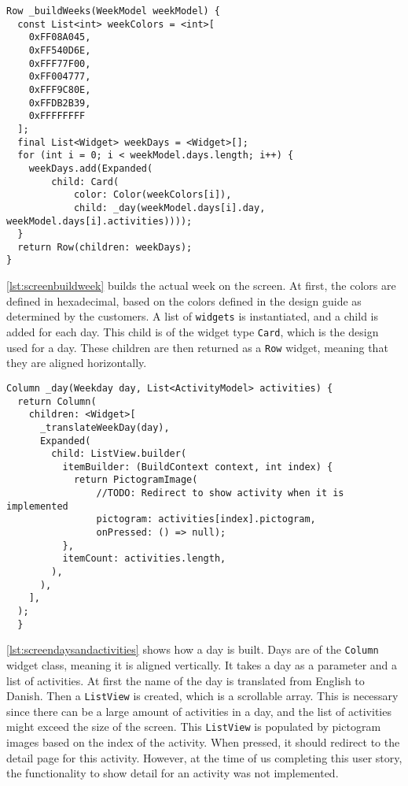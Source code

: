 \begin{lstlisting}[caption={Building the week},label={lst:screenbuildweek}]
  Row _buildWeeks(WeekModel weekModel) {
  const List<int> weekColors = <int>[
    0xFF08A045,
    0xFF540D6E,
    0xFFF77F00,
    0xFF004777,
    0xFFF9C80E,
    0xFFDB2B39,
    0xFFFFFFFF
  ];
  final List<Widget> weekDays = <Widget>[];
  for (int i = 0; i < weekModel.days.length; i++) {
    weekDays.add(Expanded(
        child: Card(
            color: Color(weekColors[i]),
            child: _day(weekModel.days[i].day, weekModel.days[i].activities))));
  }
  return Row(children: weekDays);
}
\end{lstlisting}
\autoref{lst:screenbuildweek} builds the actual week on the screen.
At first, the colors are defined in hexadecimal, based on the colors defined in the design guide as determined by the customers.
A list of \texttt{widgets} is instantiated, and a child is added for each day.
This child is of the widget type \texttt{Card}, which is the design used for a day.
These children are then returned as a \texttt{Row} widget, meaning that they are aligned horizontally.

\begin{lstlisting}[caption={Building days and activities},label={lst:screendaysandactivities}]
  Column _day(Weekday day, List<ActivityModel> activities) {
  return Column(
    children: <Widget>[
      _translateWeekDay(day),
      Expanded(
        child: ListView.builder(
          itemBuilder: (BuildContext context, int index) {
            return PictogramImage(
                //TODO: Redirect to show activity when it is implemented
                pictogram: activities[index].pictogram,
                onPressed: () => null);
          },
          itemCount: activities.length,
        ),
      ),
    ],
  );
  }
\end{lstlisting}
\autoref{lst:screendaysandactivities} shows how a day is built.
Days are of the \texttt{Column} widget class, meaning it is aligned vertically.
It takes a day as a parameter and a list of activities.
At first the name of the day is translated from English to Danish.
Then a \texttt{ListView} is created, which is a scrollable array. 
This is necessary since there can be a large amount of activities in a day, and the list of activities might exceed the size of the screen.
This \texttt{ListView} is populated by pictogram images based on the index of the activity.
When pressed, it should redirect to the detail page for this activity.
However, at the time of us completing this user story, the functionality to show detail for an activity was not implemented.
